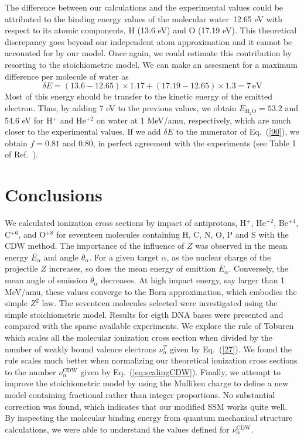 \documentclass[preprint,12pt]{article}
\begin{document}
The difference between our calculations and the experimental values 
could be attributed to the binding energy values of the molecular 
water~12.65 eV with respect to its atomic components, H (13.6 eV) and 
O (17.19 eV). This theoretical discrepancy goes beyond our independent 
atom approximation and it cannot be accounted for by our model. Once 
again, we could estimate this contribution by resorting to the 
stoichiometric model. We can make an assesment for a maximum difference 
per molecule of water as 
\begin{equation}
\delta E=(13.6-12.65)\times1.17+(17.19-12.65)\times1.3=7\,\text{eV}  
\label{80}
\end{equation}
Most of this energy should be transfer to the kinetic energy of the 
emitted electron. Thus, by adding 7 eV to the previous values, we obtain
$\overline{E}_{\text{H}_2\text{O}}=53.2$ and 54.6 eV for H$^{+}$ and 
He$^{+2}$ on water at 1 MeV/amu, respectively, which are much closer to
the experimental values. If we add $\delta E$ to the numerator of 
Eq.~(\ref{90}), we obtain $f=0.81$ and $0.80$, in perfect agreement with 
the experiments (see Table 1 of Ref.~\cite{pimblott2007}).

\section{Conclusions}

We calculated ionization cross sections by impact of antiprotons, 
H$^{+}$, He$^{+2}$, Be$^{+4}$, C$^{+6}$, and O$^{+8}$ for seventeen 
molecules containing H, C, N, O, P and S with the CDW method. The 
importance of the influence of $Z$ was observed in the mean energy 
$\overline{E}_{\alpha}$ and angle $\overline{\theta}_{\alpha}$. 
For a given target $\alpha$, as the nuclear charge of the projectile 
$Z$ increases, so does the mean energy of emittion $\overline{E}_{\alpha}$. 
Conversely, the mean angle of emission  $\overline{\theta}_{\alpha}$ 
decreases. At high impact energy, say larger than 1 MeV/amu, these 
values converge to the Born approximation, which embodies the simple 
$Z^{2}$ law. The seventeen molecules selected were investigated using 
the simple stoichiometric model. Results for eigth DNA bases were 
presented and compared with the sparse available experiments. We explore 
the rule of Toburen which scales all the molecular ionization cross 
section when divided by the number of weakly bound valence electrons 
$\nu_{\alpha}^T$ given by Eq.~(\ref{27}). 
We found the rule scales much better when normalizing our theoretical 
ionization cross sections to the number $\nu_{\alpha}^{\text{CDW}}$ 
given by Eq.~(\ref{eq:scalingCDW}). Finally, we attempt to improve the 
stoichiometric model by using the Mulliken charge to define a new model 
containing fractional rather than integer proportions. No substantial 
correction was found, which indicates that our modified SSM works quite 
well. By inspecting the molecular binding energy from quantum mechanical 
structure calculations, we were able to understand the values defined
for $\nu_{\alpha}^{\text{CDW}}$.
\end{document}
